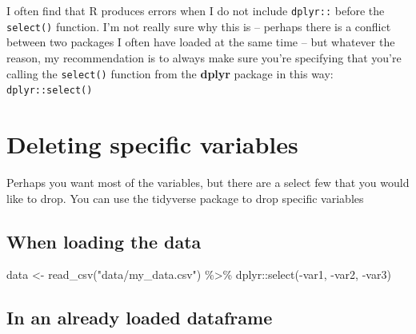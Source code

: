 \documentclass[
  letterpaper,
  DIV=11,
  numbers=noendperiod]{scrreprt}
\newenvironment{Shaded}{\begin{snugshade}}{\end{snugshade}}
\newcommand{\FunctionTok}[1]{\textcolor[rgb]{0.28,0.35,0.67}{#1}}
\newcommand{\NormalTok}[1]{\textcolor[rgb]{0.00,0.23,0.31}{#1}}
\newcommand{\OtherTok}[1]{\textcolor[rgb]{0.00,0.23,0.31}{#1}}
\newcommand{\SpecialCharTok}[1]{\textcolor[rgb]{0.37,0.37,0.37}{#1}}
\newcommand{\StringTok}[1]{\textcolor[rgb]{0.13,0.47,0.30}{#1}}
\begin{document}
\begin{tcolorbox}[enhanced jigsaw, toprule=.15mm, coltitle=black, colframe=quarto-callout-warning-color-frame, colbacktitle=quarto-callout-warning-color!10!white, opacityback=0, left=2mm, breakable, rightrule=.15mm, bottomrule=.15mm, leftrule=.75mm, titlerule=0mm, arc=.35mm, opacitybacktitle=0.6, toptitle=1mm, bottomtitle=1mm, title=\textcolor{quarto-callout-warning-color}{\faExclamationTriangle}\hspace{0.5em}{Common Error}, colback=white]

I often find that R produces errors when I do not include
\texttt{dplyr::} before the \texttt{select()} function. I'm not really
sure why this is -- perhaps there is a conflict between two packages I
often have loaded at the same time -- but whatever the reason, my
recommendation is to always make sure you're specifying that you're
calling the \texttt{select()} function from the \textbf{dplyr} package
in this way: \texttt{dplyr::select()}

\end{tcolorbox}

\section{Deleting specific variables}\label{deleting-specific-variables}

Perhaps you want most of the variables, but there are a select few that
you would like to drop. You can use the tidyverse package to drop
specific variables

\subsection{When loading the data}\label{when-loading-the-data}

\begin{Shaded}
\begin{Highlighting}[]
\NormalTok{data }\OtherTok{\textless{}{-}} \FunctionTok{read\_csv}\NormalTok{(}\StringTok{"data/my\_data.csv"}\NormalTok{) }\SpecialCharTok{\%\textgreater{}\%}
\NormalTok{  dplyr}\SpecialCharTok{::}\FunctionTok{select}\NormalTok{(}\SpecialCharTok{{-}}\NormalTok{var1, }\SpecialCharTok{{-}}\NormalTok{var2, }\SpecialCharTok{{-}}\NormalTok{var3)}
\end{Highlighting}
\end{Shaded}

\subsection{In an already loaded
dataframe}\label{in-an-already-loaded-dataframe}
\end{document}
